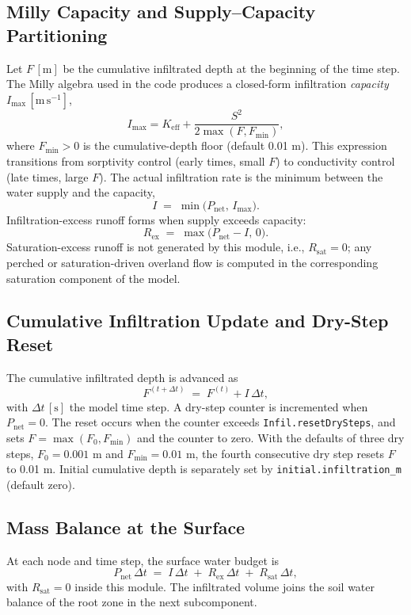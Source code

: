 \documentclass[12pt]{article}
\begin{document}
\subsection{Milly Capacity and Supply--Capacity Partitioning}
Let \(F\,[\mathrm{m}]\) be the cumulative infiltrated depth at the beginning of the time step. The Milly algebra used in the code produces a closed-form infiltration \emph{capacity} \(I_{\max}\,[\mathrm{m\,s^{-1}}]\),
\[
I_{\max}=K_{\mathrm{eff}}+\frac{S^2}{2\max(F,F_{\min})},
\]
where $F_{\min}>0$ is the cumulative-depth floor (default 0.01 m). This expression transitions from sorptivity control (early times, small \(F\)) to conductivity control (late times, large \(F\)). The actual infiltration rate is the minimum between the water supply and the capacity,
\[
I \;=\; \min\!\bigl(P_{\mathrm{net}},\, I_{\max}\bigr).
\]
Infiltration-excess runoff forms when supply exceeds capacity:
\[
R_{\mathrm{ex}} \;=\; \max\!\bigl(P_{\mathrm{net}}-I,\,0\bigr).
\]
Saturation-excess runoff is not generated by this module, i.e., \(R_{\mathrm{sat}}=0\); any perched or saturation-driven overland flow is computed in the corresponding saturation component of the model.

\subsection{Cumulative Infiltration Update and Dry-Step Reset}
The cumulative infiltrated depth is advanced as
\[
F^{(t+\Delta t)} \;=\; F^{(t)} + I\,\Delta t,
\]
with \(\Delta t\,[\mathrm{s}]\) the model time step. A dry-step counter is incremented when \(P_{\mathrm{net}}=0\). The reset occurs when the counter exceeds \texttt{Infil.resetDrySteps}, and sets $F=\max(F_0,F_{\min})$ and the counter to zero. With the defaults of three dry steps, $F_0=0.001$ m and $F_{\min}=0.01$ m, the fourth consecutive dry step resets $F$ to 0.01 m. Initial cumulative depth is separately set by \texttt{initial.infiltration\_m} (default zero).

\subsection{Mass Balance at the Surface}
At each node and time step, the surface water budget is
\[
P_{\mathrm{net}}\,\Delta t \;=\; I\,\Delta t \;+\; R_{\mathrm{ex}}\,\Delta t \;+\; R_{\mathrm{sat}}\,\Delta t,
\]
with \(R_{\mathrm{sat}}=0\) inside this module. The infiltrated volume joins the soil water balance of the root zone in the next subcomponent.
\end{document}
